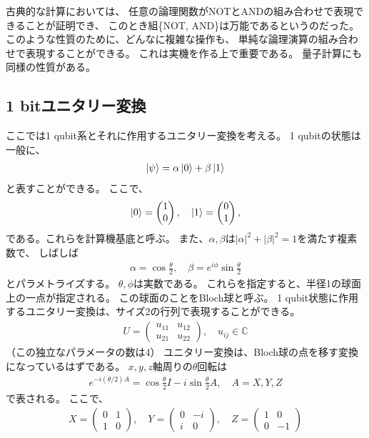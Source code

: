 \documentclass[]{ltjsarticle}
\newcommand{\complex}{\mathbb{C}}
\begin{document}
古典的な計算においては、
任意の論理関数がNOTとANDの組み合わせで表現できることが証明でき、
このとき組\{NOT, AND\}は万能であるというのだった。
このような性質のために、どんなに複雑な操作も、
単純な論理演算の組み合わせで表現することができる。
これは実機を作る上で重要である。
量子計算にも同様の性質がある。


\subsection{1 bitユニタリー変換}
ここでは1 qubit系とそれに作用するユニタリー変換を考える。
1 qubitの状態は一般に、
\begin{align}
    \ket{\psi} 
    =
    \alpha \ket{0} + \beta\ket{1}
\end{align}
と表すことができる。
ここで、
\begin{align}
    \ket{0} 
    = 
    \begin{pmatrix}
    1 \\ 0    
    \end{pmatrix}, \quad 
    \ket{1} 
    = 
    \begin{pmatrix}
    0 \\ 1    
    \end{pmatrix},
\end{align}
である。これらを計算機基底と呼ぶ。
また、$\alpha, \beta$は$|\alpha|^2 + |\beta|^2 = 1$を満たす複素数で、
しばしば
\begin{align}
    \alpha = \cos\frac{\theta}{2}, \quad 
    \beta = e^{i\phi}\sin\frac{\theta}{2}
\end{align}
とパラメトライズする。
$\theta, \phi$は実数である。
これらを指定すると、半径1の球面上の一点が指定される。
この球面のことをBloch球と呼ぶ。
1 qubit状態に作用するユニタリー変換は、サイズ2の行列で表現することができる。
\begin{align}
    U = 
    \begin{pmatrix}
        u_{11} & u_{12} \\
        u_{21} & u_{22}
    \end{pmatrix}, \quad u_{ij} \in \complex
\end{align}
（この独立なパラメータの数は4）
ユニタリー変換は、Bloch球の点を移す変換になっているはずである。
$x,y,z$軸周りの$\theta$回転は
\begin{align}
    e^{-i(\theta/2)A} = \cos\frac{\theta}{2}I - i\sin\frac{\theta}{2}A,
    \quad 
    A = X, Y, Z
\end{align}
で表される。
ここで、
\begin{align}
    X = 
    \begin{pmatrix}
    0 & 1 \\ 1 & 0     
    \end{pmatrix},\quad 
    Y = 
    \begin{pmatrix}
    0 & -i \\ i & 0     
    \end{pmatrix},\quad 
    Z = 
    \begin{pmatrix}
    1 & 0 \\ 0 & -1     
    \end{pmatrix} 
\end{align}
\end{document}
